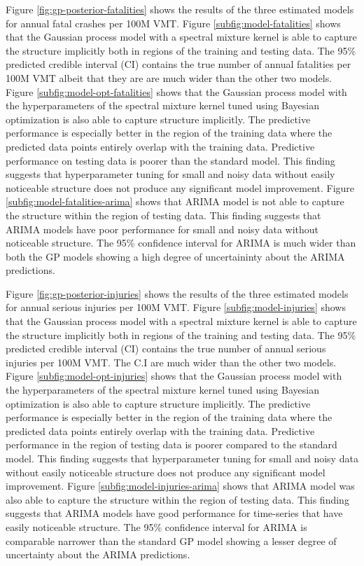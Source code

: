 \documentclass[letterpaper]{article}
\begin{document}
Figure \ref{fig:gp-posterior-fatalities} shows the results of the three estimated models for annual fatal crashes per 100M VMT. Figure \ref{subfig:model-fatalities} shows that the Gaussian process model with a spectral mixture kernel is able to capture the structure implicitly both in regions of the training and testing data. The 95\% predicted credible interval (CI) contains the true number of annual fatalities per 100M VMT albeit that they are are much wider than the other two models. Figure \ref{subfig:model-opt-fatalities} shows that the Gaussian process model with the hyperparameters of the spectral mixture kernel tuned using Bayesian optimization is also able to capture structure implicitly. The predictive performance is especially better in the region of the training data where the predicted data points entirely overlap with the training data. Predictive performance on testing data is poorer than the standard model. This finding suggests that hyperparameter tuning for small and noisy data without easily noticeable structure does not produce any significant model improvement. Figure \ref{subfig:model-fatalities-arima} shows that ARIMA model is not able to capture the structure within the region of testing data. This finding suggests that ARIMA models have poor performance for small and noisy data without noticeable structure. The 95\% confidence interval for ARIMA is much wider than both the GP models showing a high degree of uncertaininty about the ARIMA predictions.

Figure \ref{fig:gp-posterior-injuries} shows the results of the three estimated models for annual serious injuries per 100M VMT. Figure \ref{subfig:model-injuries} shows that the Gaussian process model with a spectral mixture kernel is able to capture the structure implicitly both in regions of the training and testing data. The 95\% predicted credible interval (CI) contains the true number of annual serious injuries per 100M VMT. The C.I are much wider than the other two models. Figure \ref{subfig:model-opt-injuries} shows that the Gaussian process model with the hyperparameters of the spectral mixture kernel tuned using Bayesian optimization is also able to capture structure implicitly. The predictive performance is especially better in the region of the training data where the predicted data points entirely overlap with the training data. Predictive performance in the region of testing data is poorer compared to the standard model. This finding suggests that hyperparameter tuning for small and noisy data without easily noticeable structure does not produce any significant model improvement. Figure \ref{subfig:model-injuries-arima} shows that ARIMA model was also able to capture the structure within the region of testing data. This finding suggests that ARIMA models have good performance for time-series that have easily noticeable structure. The 95\% confidence interval for ARIMA is comparable narrower than the standard GP model showing a lesser degree of uncertainty about the ARIMA predictions.
\end{document}
